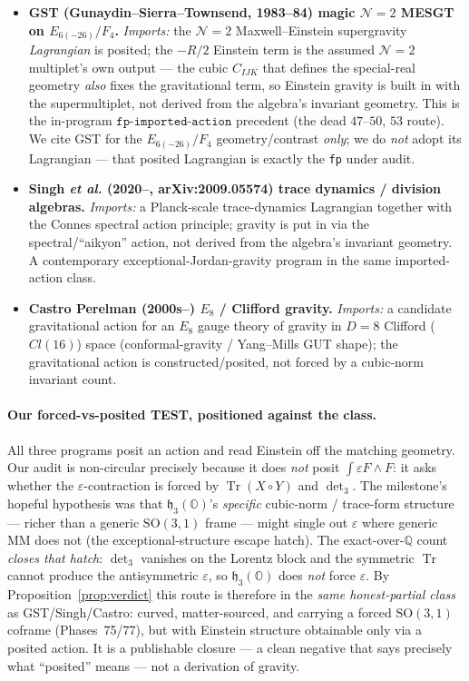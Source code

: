 \documentclass[11pt]{article}
\newcommand{\Q}{\mathbb{Q}}
\newcommand{\OO}{\mathbb{O}}
\newcommand{\Tr}{\operatorname{Tr}}
\newcommand{\hh}{\mathfrak{h}}
\theoremstyle{definition}\newtheorem{remark}{Remark}
\theoremstyle{definition}\newtheorem{definition}{Definition}
\theoremstyle{plain}\newtheorem{proposition}{Proposition}
\theoremstyle{plain}\newtheorem{lemma}{Lemma}
\begin{document}
\begin{itemize}
\item \textbf{GST (Gunaydin--Sierra--Townsend, 1983--84) magic $\mathcal{N}=2$ MESGT on
$E_{6(-26)}/F_4$.} \emph{Imports:} the $\mathcal{N}=2$ Maxwell--Einstein supergravity
\emph{Lagrangian} is posited; the $-R/2$ Einstein term is the assumed $\mathcal{N}=2$
multiplet's own output --- the cubic $C_{IJK}$ that defines the special-real geometry
\emph{also} fixes the gravitational term, so Einstein gravity is built in with the
supermultiplet, not derived from the algebra's invariant geometry. This is the
in-program $\texttt{fp-imported-action}$ precedent (the dead $47\text{--}50,\,53$
route). We cite GST for the $E_{6(-26)}/F_4$ geometry/contrast \emph{only}; we do
\emph{not} adopt its Lagrangian --- that posited Lagrangian is exactly the
\texttt{fp} under audit.
\item \textbf{Singh \emph{et al.} (2020--, arXiv:2009.05574) trace dynamics / division
algebras.} \emph{Imports:} a Planck-scale trace-dynamics Lagrangian together with the
Connes spectral action principle; gravity is put in via the spectral/``aikyon''
action, not derived from the algebra's invariant geometry. A contemporary
exceptional-Jordan-gravity program in the same imported-action class.
\item \textbf{Castro Perelman (2000s--) $E_8$ / Clifford gravity.} \emph{Imports:} a
candidate gravitational action for an $E_8$ gauge theory of gravity in $D=8$ Clifford
($Cl(16)$) space (conformal-gravity / Yang--Mills GUT shape); the gravitational action
is constructed/posited, not forced by a cubic-norm invariant count.
\end{itemize}

\paragraph{Our forced-vs-posited TEST, positioned against the class.} All three
programs posit an action and read Einstein off the matching geometry. Our audit is
non-circular precisely because it does \emph{not} posit $\int\varepsilon F\wedge F$: it
asks whether the $\varepsilon$-contraction is forced by $\Tr(X\circ Y)$ and
$\det\nolimits_3$. The milestone's hopeful hypothesis was that $\hh_3(\OO)$'s
\emph{specific} cubic-norm / trace-form structure --- richer than a generic
$\mathrm{SO}(3,1)$ frame --- might single out $\varepsilon$ where generic MM does not
(the exceptional-structure escape hatch). The exact-over-$\Q$ count
\emph{closes that hatch}: $\det\nolimits_3$ vanishes on the Lorentz block and the
symmetric $\Tr$ cannot produce the antisymmetric $\varepsilon$, so $\hh_3(\OO)$ does
\emph{not} force $\varepsilon$. By Proposition~\ref{prop:verdict} this route is therefore
in the \emph{same honest-partial class} as GST/Singh/Castro: curved, matter-sourced, and
carrying a forced $\mathrm{SO}(3,1)$ coframe (Phases~75/77), but with Einstein structure
obtainable only via a posited action. It is a publishable closure --- a clean negative
that says precisely what ``posited'' means --- not a derivation of gravity.
\end{document}
